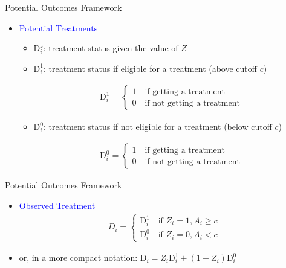 \documentclass[hyperref={pdfpagelabels=false}]{beamer}
\begin{document}
\begin{frame}{Potential Outcomes Framework}
	\begin{itemize}
		
		\item \textcolor{blue}{Potential Treatments}
		\vspace{0.2cm}
		\begin{itemize}
			\item $\mathrm{D}^{z}_{i}$: treatment status given the value of $Z$
			\vspace{0.2cm}
			\item $\mathrm{D}^{1}_{i}$: treatment status if eligible for a treatment (above cutoff $c$)
			\vspace{0.2cm}
			
			\begin{align*}
				\mathrm{D}^{1}_{i}=\left\lbrace
				\begin{array}{l}
					1\quad \text{if getting a treatment}\\
					0\quad \text{if not getting a treatment}
				\end{array}\right.
			\end{align*}		
			
			
			\item $\mathrm{D}^{0}_{i}$: treatment status if not eligible for a treatment (below cutoff $c$)
			
			\begin{align*}
				\mathrm{D}^{0}_{i}=\left\lbrace
				\begin{array}{l}
					1\quad \text{if getting a treatment}\\
					0\quad \text{if not getting a treatment}
				\end{array}\right.
			\end{align*}		
			
			
		\end{itemize}
		
	\end{itemize}
\end{frame}






\begin{frame}{Potential Outcomes Framework}
	\begin{itemize}
		
		\item \textcolor{blue}{Observed Treatment}
		\begin{align*}
			D_{i}=\left\lbrace
			\begin{array}{l}
				\mathrm{D}^{1}_{i}\quad \text{if $Z_{i}=1, A_i\geq c$} \\
				\mathrm{D}^{0}_{i}\quad \text{if $Z_{i}=0, A_i< c$}
			\end{array}\right.
		\end{align*}
		\item or, in a more compact notation: 
		$\mathrm{D}_{i}=Z_{i}\mathrm{D}^{1}_{i}+(1-Z_{i})\mathrm{D}^{0}_{i} $
		
	\end{itemize}
\end{frame}
\end{document}
